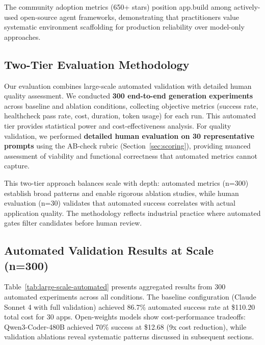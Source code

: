\documentclass[conference]{IEEEtran}
\begin{document}
The community adoption metrics (650+ stars) position app.build among actively-used open-source agent frameworks, demonstrating that practitioners value systematic environment scaffolding for production reliability over model-only approaches.

\subsection{Two-Tier Evaluation Methodology}

Our evaluation combines large-scale automated validation with detailed human quality assessment. We conducted \textbf{300 end-to-end generation experiments} across baseline and ablation conditions, collecting objective metrics (success rate, healthcheck pass rate, cost, duration, token usage) for each run. This automated tier provides statistical power and cost-effectiveness analysis. For quality validation, we performed \textbf{detailed human evaluation on 30 representative prompts} using the AB-check rubric (Section~\ref{sec:scoring}), providing nuanced assessment of viability and functional correctness that automated metrics cannot capture.

This two-tier approach balances scale with depth: automated metrics (n=300) establish broad patterns and enable rigorous ablation studies, while human evaluation (n=30) validates that automated success correlates with actual application quality. The methodology reflects industrial practice where automated gates filter candidates before human review.

\subsection{Automated Validation Results at Scale (n=300)}

Table~\ref{tab:large-scale-automated} presents aggregated results from 300 automated experiments across all conditions. The baseline configuration (Claude Sonnet 4 with full validation) achieved 86.7\% automated success rate at \$110.20 total cost for 30 apps. Open-weights models show cost-performance tradeoffs: Qwen3-Coder-480B achieved 70\% success at \$12.68 (9x cost reduction), while validation ablations reveal systematic patterns discussed in subsequent sections.
\end{document}
